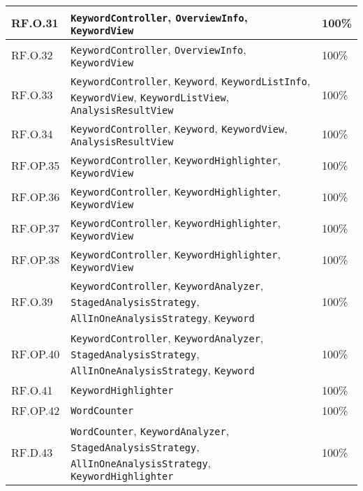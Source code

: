 \begin{tabularx}{\textwidth}{l >{\raggedright\arraybackslash}X l}
  \hline 
  RF.O.31 & \texttt{KeywordController}, \texttt{OverviewInfo}, \texttt{KeywordView} & 100\% \\
  \hline 
  RF.O.32 & \texttt{KeywordController}, \texttt{OverviewInfo}, \texttt{KeywordView} & 100\% \\
  \hline 
  RF.O.33 & \texttt{KeywordController}, \texttt{Keyword}, \texttt{KeywordListInfo}, \texttt{KeywordView}, \texttt{KeywordListView}, \texttt{AnalysisResultView} & 100\% \\
  \hline 
  RF.O.34 & \texttt{KeywordController}, \texttt{Keyword}, \texttt{KeywordView}, \texttt{AnalysisResultView} & 100\% \\
  \hline 
  RF.OP.35 & \texttt{KeywordController}, \texttt{KeywordHighlighter}, \texttt{KeywordView} & 100\% \\
  \hline 
  RF.OP.36 & \texttt{KeywordController}, \texttt{KeywordHighlighter}, \texttt{KeywordView} & 100\% \\
  \hline 
  RF.OP.37 & \texttt{KeywordController}, \texttt{KeywordHighlighter}, \texttt{KeywordView} & 100\% \\
  \hline 
  RF.OP.38 & \texttt{KeywordController}, \texttt{KeywordHighlighter}, \texttt{KeywordView} & 100\% \\
  \hline 
  RF.O.39 & \texttt{KeywordController}, \texttt{KeywordAnalyzer}, \texttt{StagedAnalysisStrategy}, \texttt{AllInOneAnalysisStrategy}, \texttt{Keyword} & 100\% \\
  \hline 
  RF.OP.40 & \texttt{KeywordController}, \texttt{KeywordAnalyzer}, \texttt{StagedAnalysisStrategy}, \texttt{AllInOneAnalysisStrategy}, \texttt{Keyword} & 100\% \\
  \hline 
  RF.O.41 & \texttt{KeywordHighlighter} & 100\% \\
  \hline 
  RF.OP.42 & \texttt{WordCounter} & 100\% \\
  \hline 
  RF.D.43 & \texttt{WordCounter}, \texttt{KeywordAnalyzer}, \texttt{StagedAnalysisStrategy}, \texttt{AllInOneAnalysisStrategy}, \texttt{KeywordHighlighter} & 100\% \\
\end{tabularx}